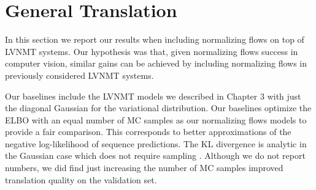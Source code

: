 

\section{General Translation}

In this section we report our results when including normalizing flows on top of \ac{LVNMT} systems. Our hypothesis was that, given normalizing flows success in computer vision, similar gains can be achieved by including normalizing flows in previously considered \ac{LVNMT} systems.  


Our baselines include the \ac{LVNMT} models we described in Chapter 3 with just the diagonal Gaussian for the variational distribution. Our baselines optimize the \ac{ELBO} with an equal number of \ac{MC} samples as our normalizing flows models to provide a fair comparison. This corresponds to better approximations of the negative log-likelihood of sequence predictions. The KL divergence is analytic in the Gaussian case which does not require sampling \cite{kingma2014autoencodingVB,rezende2014stochasticBackprop}. Although we do not report numbers, we did find just increasing the number of \ac{MC} samples improved translation quality on the validation set.

